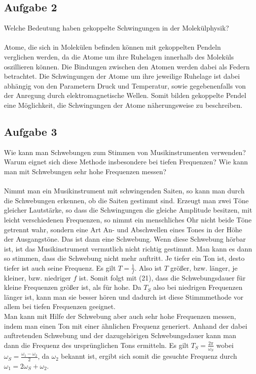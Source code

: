 \documentclass[a4paper,10pt]{scrartcl}
\begin{document}
		\subsection{Aufgabe 2}
			Welche Bedeutung haben gekoppelte Schwingungen in der Molekülphysik?\\
			\\
			Atome, die sich in Molekülen befinden können mit gekoppelten Pendeln verglichen werden, da die Atome um ihre Ruhelagen innerhalb des Moleküls oszillieren können. Die Bindungen zwischen den Atomen werden dabei als Federn betrachtet. Die Schwingungen der Atome um ihre jeweilige Ruhelage ist dabei abhängig von den Parametern Druck und Temperatur, sowie gegebenenfalls von der Anregung durch elektromagnetische Wellen. Somit bilden gekoppelte Pendel eine Möglichkeit, die Schwingungen der Atome näherungsweise zu beschreiben.
			
		\subsection{Aufgabe 3}
			Wie kann man Schwebungen zum Stimmen von Musikinstrumenten verwenden?Warum eignet
			sich diese Methode insbesondere bei tiefen Frequenzen? Wie kann man mit Schwebungen sehr
			hohe Frequenzen messen?\\
			\\
			Nimmt man ein Musikinstrument mit schwingenden Saiten, so kann man durch die Schwebungen erkennen, ob die Saiten gestimmt sind. Erzeugt man zwei Töne gleicher Lautstärke, so dass die Schwingungen die gleiche Amplitude besitzen, mit leicht verschiedenen Frequenzen, so nimmt ein menschliches Ohr nicht beide Töne getrennt wahr, sondern eine Art An- und Abschwellen eines Tones in der Höhe der Ausgangstöne. Das ist dann eine Schwebung. Wenn diese Schwebung hörbar ist, ist das Musikinstrument vermutlich nicht richtig gestimmt. Man kann es dann so stimmen, dass die Schwebung nicht mehr auftritt. Je tiefer ein Ton ist, desto tiefer ist auch seine Frequenz. Es gilt \(T=\frac{1}{f}\). Also ist \(T\) größer, bzw. länger, je kleiner, bzw. niedriger \(f\) ist. Somit folgt mit (21), dass die Schwebungsdauer für kleine Frequenzen größer ist, als für hohe. Da \(T_{S}\) also bei niedrigen Frequenzen länger ist, kann man sie besser hören und dadurch ist diese Stimmmethode vor allem bei tiefen Frequenzen geeignet.\\
			Man kann mit Hilfe der Schwebung aber auch sehr hohe Frequenzen messen, indem man einen Ton mit einer ähnlichen Frequenz generiert. Anhand der dabei auftretenden Schwebung und der dazugehörigen Schwebungsdauer kann man dann die Frequenz des ursprünglichen Tons ermitteln. Es  gilt \(T_{S}=\frac{2\pi}{\omega_{S}}\) wobei \(\omega_{S}=\frac{\omega_{1}-\omega_{2}}{2}\), da \(\omega_{2}\) bekannt ist, ergibt sich somit die gesuchte Frequenz durch \(\omega_{1}=2\omega_{S}+\omega_{2}\). 
			
\end{document}
